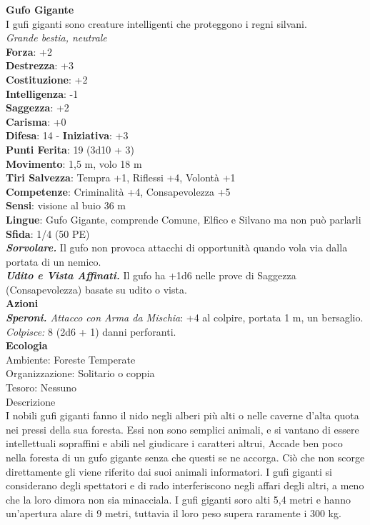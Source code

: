 \begin{multicols}{2}
\medskip\textbf{Gufo Gigante}\\
I gufi giganti sono creature intelligenti che proteggono i regni silvani.\\
\emph{Grande bestia, neutrale}\\
\textbf{Forza}: +2\\
\textbf{Destrezza}: +3\\
\textbf{Costituzione}: +2\\
\textbf{Intelligenza}: -1\\
\textbf{Saggezza}: +2\\
\textbf{Carisma}: +0\\
\textbf{Difesa}: 14 - \textbf{Iniziativa}: +3\\
\textbf{Punti Ferita}: 19 (3d10 + 3)\\
\textbf{Movimento}: 1,5 m, volo 18 m\\
\textbf{Tiri Salvezza}: Tempra +1, Riflessi +4, Volontà +1 \\
\textbf{Competenze}: Criminalità +4, Consapevolezza +5\\
\textbf{Sensi}: visione al buio 36 m\\
\textbf{Lingue}: Gufo Gigante, comprende Comune, Elfico e Silvano ma non può parlarli\\
\textbf{Sfida}: 1/4 (50 PE)\smallskip\\
\emph{\textbf{Sorvolare.}} Il gufo non provoca attacchi di opportunità quando vola via dalla portata di un nemico.\\
\emph{\textbf{Udito e Vista Affinati.}} Il gufo ha +1d6 nelle prove di Saggezza (Consapevolezza) basate su udito o vista.\\
\smallskip\textbf{Azioni}\\
\emph{\textbf{Speroni.} Attacco con Arma da Mischia}: +4 al colpire, portata 1 m, un bersaglio.\\
\emph{Colpisce:} 8 (2d6 + 1) danni perforanti.\\
\textbf{Ecologia}\\
Ambiente: Foreste Temperate\\
Organizzazione: Solitario o coppia\\
Tesoro: Nessuno\\
Descrizione\\

I nobili gufi giganti fanno il nido negli alberi più alti o nelle caverne d'alta quota nei pressi della sua foresta. Essi non sono semplici animali, e si vantano di essere intellettuali sopraffini e abili nel giudicare i caratteri altrui, Accade ben poco nella foresta di un gufo gigante senza che questi se ne accorga. Ciò che non scorge direttamente gli viene riferito dai suoi animali informatori. I gufi giganti si considerano degli spettatori e di rado interferiscono negli affari degli altri, a meno che la loro dimora non sia minacciala. I gufi giganti soro alti 5,4 metri e hanno un'apertura alare di 9 metri, tuttavia il loro peso supera raramente i 300 kg. \\



\end{multicols}
